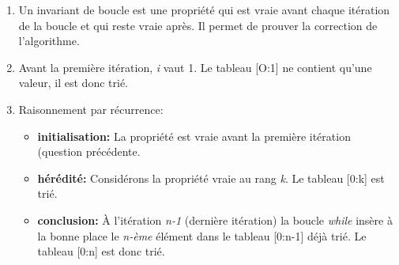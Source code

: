 \documentclass[a4paper,11pt]{article}
\begin{document}
\begin{Form}
\begin{exo}

\end{exo}
\begin{exo}

\end{exo}
\begin{exo}

\end{exo}
\begin{exo}
\begin{enumerate}
\item Un invariant de boucle est une propriété qui est vraie avant chaque itération de la boucle et qui reste vraie après. Il permet de prouver la correction de l'algorithme.
\item Avant la première itération, \emph{i} vaut 1. Le tableau [O:1] ne contient qu'une valeur, il est donc trié.
\item Raisonnement par récurrence:
\begin{itemize}
\item \textbf{initialisation:} La propriété est vraie avant la première itération (question précédente.
\item \textbf{hérédité:} Considérons la propriété vraie au rang \emph{k}. Le tableau [0:k] est trié.
\item \textbf{conclusion:} À l'itération \emph{n-1} (dernière itération) la boucle \emph{while} insère à la bonne place le \emph{n-ème} élément dans le tableau [0:n-1] déjà trié. Le tableau [0:n] est donc trié.
\end{itemize}
\end{enumerate}
\end{exo}
\begin{exo}

\end{exo}
\begin{exo}

\end{exo}
\end{Form}
\end{document}
